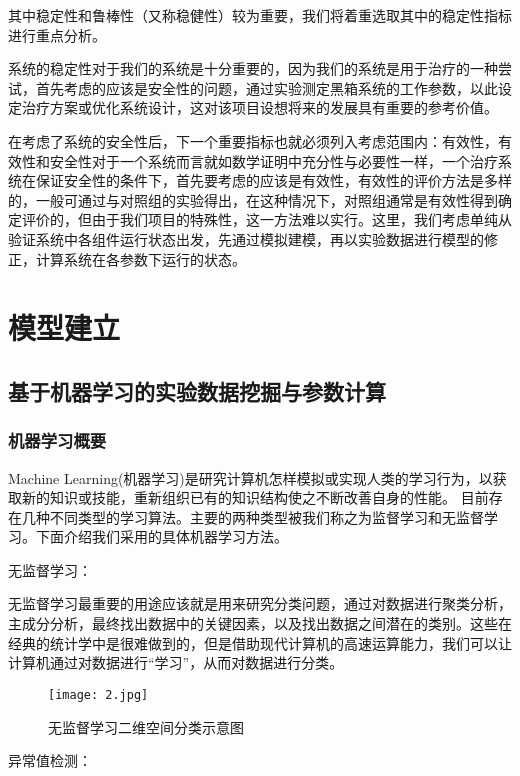 \documentclass[withoutpreface,bwprint]{cumcmthesis} %
\begin{document}
其中稳定性和鲁棒性（又称稳健性）较为重要，我们将着重选取其中的稳定性指标进行重点分析。

系统的稳定性对于我们的系统是十分重要的，因为我们的系统是用于治疗的一种尝试，首先考虑的应该是安全性的问题，通过实验测定黑箱系统的工作参数，以此设定治疗方案或优化系统设计，这对该项目设想将来的发展具有重要的参考价值。

在考虑了系统的安全性后，下一个重要指标也就必须列入考虑范围内：有效性，有效性和安全性对于一个系统而言就如数学证明中充分性与必要性一样，一个治疗系统在保证安全性的条件下，首先要考虑的应该是有效性，有效性的评价方法是多样的，一般可通过与对照组的实验得出，在这种情况下，对照组通常是有效性得到确定评价的，但由于我们项目的特殊性，这一方法难以实行。这里，我们考虑单纯从验证系统中各组件运行状态出发，先通过模拟建模，再以实验数据进行模型的修正，计算系统在各参数下运行的状态。




\section{模型建立}
\subsection{基于机器学习的实验数据挖掘与参数计算}
\subsubsection{机器学习概要}
Machine Learning(机器学习)是研究计算机怎样模拟或实现人类的学习行为，以获取新的知识或技能，重新组织已有的知识结构使之不断改善自身的性能。
目前存在几种不同类型的学习算法。主要的两种类型被我们称之为监督学习和无监督学习。下面介绍我们采用的具体机器学习方法。

\begin{tabbing}
无监督学习：
\end{tabbing}

无监督学习最重要的用途应该就是用来研究分类问题，通过对数据进行聚类分析，主成分分析，最终找出数据中的关键因素，以及找出数据之间潜在的类别。这些在经典的统计学中是很难做到的，但是借助现代计算机的高速运算能力，我们可以让计算机通过对数据进行“学习”，从而对数据进行分类。
\begin{figure}[!h]
	\centering
	\texttt{[image: 2.jpg]}
	\caption{无监督学习二维空间分类示意图}
\end{figure}

\begin{tabbing}
异常值检测：
\end{tabbing}
\end{document}
